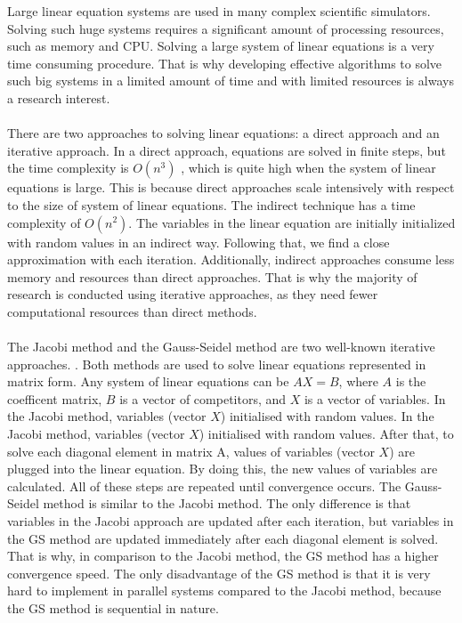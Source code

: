 \documentclass[11pt]{article}       %
\begin{document}
Large linear equation systems are used in many complex scientific simulators. Solving such huge systems requires a significant amount of processing resources, such as memory and CPU. Solving a large system of linear equations is a very time consuming procedure. That is why developing effective algorithms to solve such big systems in a limited amount of time and with limited resources is always a research interest.
\\
\\
There are two approaches to solving linear equations: a direct approach and an iterative approach. In a direct approach,  equations are solved in finite steps, but the time complexity is $O(n^{3})$ \cite{numerical-mathematics}, which is quite high when the system of linear equations is large. This is because direct approaches scale intensively with respect to the size of system of linear equations. The indirect technique has a time complexity of $O(n^2)$. The variables in the linear equation are initially initialized with random values in an indirect way. Following that, we find a close approximation with each iteration. Additionally, indirect approaches consume less memory and resources than direct approaches. That is why the majority of research is conducted using iterative approaches, as they need fewer computational resources than direct methods.
\\
\\
The Jacobi method and the Gauss-Seidel method are two well-known iterative approaches. \cite{hageman2016applied}. Both methods are used to solve linear equations represented in matrix form. Any system of linear equations can be  $AX = B$, where $A$ is the coefficent matrix, $B$ is a vector of competitors, and $X$ is a vector of variables. In the Jacobi method, variables (vector $X$) initialised with random values. In the Jacobi method, variables (vector $X$) initialised with random values. After that, to solve each diagonal element in matrix A, values of variables (vector $X$) are plugged into the linear equation.  By doing this, the new values of variables are calculated.  All of these steps are repeated until convergence occurs. The   Gauss-Seidel method is similar to the Jacobi method. The only difference is that variables in the Jacobi approach are updated after each iteration, but variables in the GS method are updated immediately after each diagonal element is solved. That is why, in comparison to the Jacobi method, the GS method has a higher convergence speed. The only disadvantage of the GS method is that it is very hard to implement in parallel systems compared to the Jacobi method, because the GS method is sequential in nature.
\end{document}

